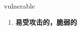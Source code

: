 
\begin{frame}
{\huge vulnerable}
\begin{center}
\begin{enumerate}\Large
  \item \textbf{易受攻击的，脆弱的}
\end{enumerate}
\end{center}
\end{frame}
